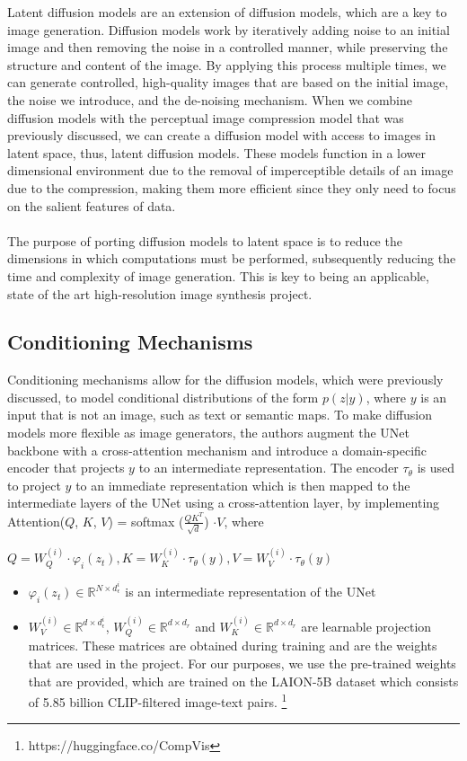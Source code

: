 \documentclass{article}
\begin{document}
Latent diffusion models are an extension of diffusion models, which are a key to image generation. Diffusion models work by iteratively adding noise to an initial image and then removing the noise in a controlled manner, while preserving the structure and content of the image. By applying this process multiple times, we can generate controlled, high-quality images that are based on the initial image, the noise we introduce, and the de-noising mechanism. When we combine diffusion models with the perceptual image compression model that was previously discussed, we can create a diffusion model with access to images in latent space, thus, latent diffusion models. These models function in a lower dimensional environment due to the removal of imperceptible details of an image due to the compression, making them more efficient since they only need to focus on the salient features of data. \\ \\
The purpose of porting diffusion models to latent space is to reduce the dimensions in which computations must be performed, subsequently reducing the time and complexity of image generation. This is key to being an applicable, state of the art high-resolution image synthesis project.
\newpage
\subsection{Conditioning Mechanisms}

Conditioning mechanisms allow for the diffusion models, which were previously discussed, to model conditional distributions of the form $p(z|y)$, where $y$ is an input that is not an image, such as text or semantic maps. To make diffusion models more flexible as image generators, the authors augment the UNet backbone with a cross-attention mechanism and introduce a domain-specific encoder that projects $y$ to an intermediate representation. The encoder $\tau_{\theta}$ is used to project $y$ to an immediate representation which is then mapped to the intermediate layers of the UNet using a cross-attention layer, by implementing Attention($Q$, $K$, $V$) = softmax ($\frac{QK^T}{\sqrt{d}}$) $\cdot V$, where \newline

\begin{center}
    $Q=W_Q^{(i)} \cdot \varphi_i\left(z_t\right), K=W_K^{(i)} \cdot \tau_\theta(y), V=W_V^{(i)} \cdot \tau_\theta(y)$    
\end{center}
\begin{itemize}
    \item $\varphi_i\left(z_t\right) \in \mathbb{R}^{N \times d_\epsilon^i}$ is an intermediate representation of the UNet 
    \item $W_V^{(i)} \in \mathbb{R}^{d \times d_\epsilon^i}$, $W_Q^{(i)} \in \mathbb{R}^{d \times d_r}$ and $W_K^{(i)} \in \mathbb{R}^{d \times d_r}$ are learnable projection matrices. These matrices are obtained during training and are the weights that are used in the project. For our purposes, we use the pre-trained weights that are provided, which are trained on the LAION-5B dataset which consists of 5.85 billion CLIP-filtered image-text pairs. \footnote{https://huggingface.co/CompVis}
\end{itemize}
\end{document}
